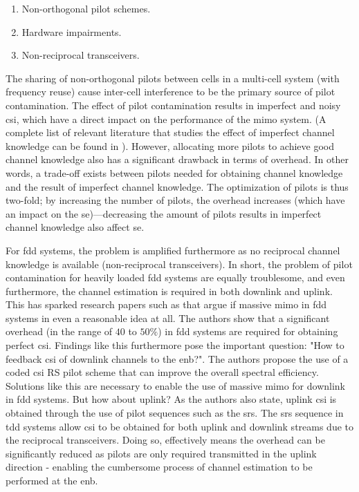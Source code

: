 \begin{enumerate}
    \item Non-orthogonal pilot schemes.
    \item Hardware impairments.
    \item Non-reciprocal transceivers.
\end{enumerate}

The sharing of non-orthogonal pilots between cells in a multi-cell system (with frequency reuse) cause inter-cell interference to be the primary source of pilot contamination. The effect of pilot contamination results in imperfect and noisy \gls{csi}, which have a direct impact on the performance of the \gls{mimo} system. (A complete list of relevant literature that studies the effect of imperfect channel knowledge can be found in \cite{Elijah2016ASystem}). However, allocating more pilots to achieve good channel knowledge also has a significant drawback in terms of overhead. In other words, a trade-off exists between pilots needed for obtaining channel knowledge and the result of imperfect channel knowledge. The optimization of pilots is thus two-fold; by increasing the number of pilots, the overhead increases (which have an impact on the \gls{se})—decreasing the amount of pilots results in imperfect channel knowledge also affect \gls{se}.

For \gls{fdd} systems, the problem is amplified furthermore as no reciprocal channel knowledge is available (non-reciprocal transceivers). In short, the problem of pilot contamination for heavily loaded \gls{fdd} systems are equally troublesome, and even furthermore, the channel estimation is required in both downlink and uplink. This has sparked research papers such as \cite{ZirwasKeySystem} that argue if massive \gls{mimo} in \gls{fdd} systems in even a reasonable idea at all. The authors show that a significant overhead (in the range of  $40$ to $50\%$) in \gls{fdd} systems are required for obtaining perfect \gls{csi}. Findings like this furthermore pose the important question: "How to feedback \gls{csi} of downlink channels to the \gls{enb}?". The authors propose the use of a coded \gls{csi} RS pilot scheme that can improve the overall spectral efficiency. Solutions like this are necessary to enable the use of massive \gls{mimo} for downlink in \gls{fdd} systems. But how about uplink? As the authors also state, uplink \gls{csi} is obtained through the use of pilot sequences such as the \gls{srs}. The \gls{srs} sequence in \gls{tdd} systems allow \gls{csi} to be obtained for both uplink and downlink streams due to the reciprocal transceivers. Doing so, effectively means the overhead can be significantly reduced as pilots are only required transmitted in the uplink direction - enabling the cumbersome process of channel estimation to be performed at the \gls{enb}. 

